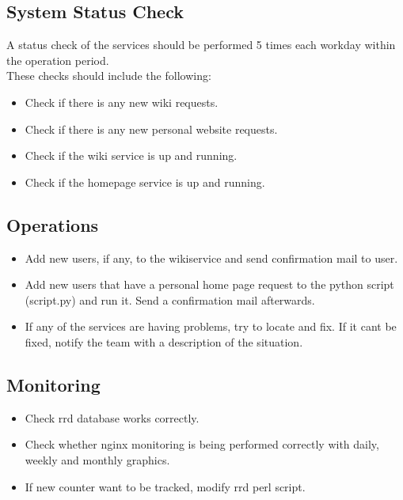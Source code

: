 \subsection{System Status Check}
A status check of the services should be performed 5 times each workday within the operation period.\\
These checks should include the following:
\begin{itemize}
\item Check if there is any new wiki requests.
\item Check if there is any new personal website requests.
\item Check if the wiki service is up and running.
\item Check if the homepage service is up and running.
\end{itemize}
\subsection{Operations}
\begin{itemize}
\item Add new users, if any, to the wikiservice and send confirmation mail to user.
\item Add new users that have a personal home page request to the python script (script.py) and run it. Send a confirmation mail afterwards.
\item If any of the services are having problems, try to locate and fix. If it cant be fixed, notify the team with a description of the situation.
\end{itemize}
\subsection{Monitoring}
\begin{itemize}
\item Check rrd database works correctly.
\item Check  whether nginx monitoring is being performed correctly with daily, weekly and monthly graphics.
\item If new counter want to be tracked, modify rrd perl script.
\end{itemize}